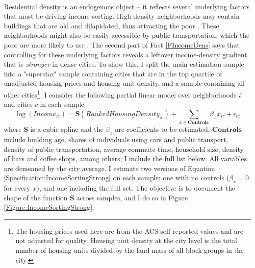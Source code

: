 \documentclass[11pt]{article}
\begin{document}
	\paragraph*{}
	Residential density is an endogenous object -- it reflects several underlying factors that must be driving income sorting. High density neighborhoods may contain buildings that are old and dilapidated, thus attracting the poor \citep{Gentrificationcycles}. These neighborhoods might also be easily accessible by public transportation, which the poor are more likely to use \citep{ccpoortransport}. The second part of Fact \ref{FIncomeDens} says that controlling for these underlying factors reveals a leftover income-density gradient that is \textit{stronger} in dense cities. To show this, I split the main estimation sample into a "superstar" sample containing cities that are in the top quartile of unadjusted housing prices and housing unit density, and a sample containing all other cities\footnote{The housing prices used here are from the ACS self-reported values and are not adjusted for quality. Housing unit density at the city level is the total number of housing units divided by the land mass of all block groups in the city.}. I consider the following partial linear model over neighborhoods $i$ and cities $c$ in each sample
	\begin{equation}\label{Specification:IncomeSortingStrong}
	\log(Income_{ic}) = \mathbf{S}(RankedHousingDensity_{ic}) + \sum_{x \in \mathbf{Controls}}\beta_{x}x_{ic} + \epsilon_{ic}
	\end{equation}
	where $\mathbf{S}$ is a cubic spline and the $\beta_{x}$ are coefficients to be estimated. $\mathbf{Controls}$ include building age, shares of individuals using cars and public transport, density of public transportation, average commute time, household size, density of bars and coffee shops, among others; I include the full list below. All variables are demeaned by the city average. I estimate two versions of Equation \eqref{Specification:IncomeSortingStrong} on each sample: one with no controls ($\beta_{x} = 0$ for every $x$), and one including the full set. The objective is to document the shape of the function $\mathbf{S}$ across samples, and I do so in Figure \ref{Figure:IncomeSortingStrong}. 
\end{document}
